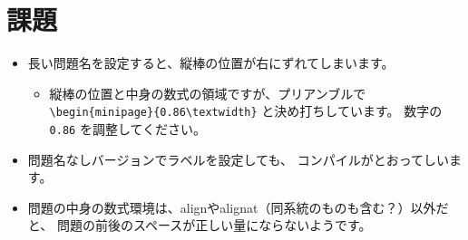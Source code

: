 \documentclass[12pt, a4paper, papersize, dvipdfmx]{jsarticle}
\begin{document}
\section{課題}
\begin{itemize}
\item 長い問題名を設定すると、縦棒の位置が右にずれてしまいます。
    \begin{itemize}
    \item 縦棒の位置と中身の数式の領域ですが、プリアンブルで \\
          \verb|\begin{minipage}{0.86\textwidth}| 
          と決め打ちしています。 
          数字の \verb|0.86| を調整してください。
    \end{itemize}
\item 問題名なしバージョンでラベルを設定しても、
      コンパイルがとおってしいます。
\item 問題の中身の数式環境は、alignやalignat（同系統のものも含む？）以外だと、
      問題の前後のスペースが正しい量にならないようです。
\end{itemize}
\end{document}
